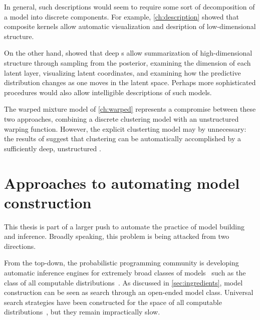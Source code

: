 \begin{itemize}
In general, such descriptions would seem to require some sort of decomposition of a model into discrete components.
For example, \cref{ch:description} showed that composite kernels allow automatic visualization and desription of low-dimensional structure.

On the other hand, \citet{damianou2012deep} showed that deep \gplvm{}s allow summarization of high-dimensional structure through sampling from the posterior, examining the dimension of each latent layer, visualizing latent coordinates, and examining how the predictive distribution changes as one moves in the latent space.
Perhaps more sophisticated procedures would also allow intelligible descriptions of such models.

\end{itemize}

The warped mixture model of \cref{ch:warped} represents a compromise between these two approaches, combining a discrete clustering model with an unstructured warping function.
However, the explicit clusterting model may by unnecessary: the results of \citet{damianou2012deep} suggest that clustering can be automatically accomplished by a sufficiently deep, unstructured \gp{}.




\section{Approaches to automating model construction}

This thesis is part of a larger push to automate the practice of model building and inference.
Broadly speaking, this problem is being attacked from two directions.

From the top-down, the probabilistic programming community is developing automatic inference engines for extremely broad classes of models~\citep{goodman2008church,mansinghka2014venture,liang2010learning} such as the class of all computable distributions~\citep{solomonoff1964formal, li2009introduction}.
As discussed in \cref{sec:ingredients}, model construction can be seen as search through an open-ended model class.
Universal search strategies have been constructed for the space of all computable distributions~\citep{hutter2002fastest,schmidhuber2002speed,levin1973universal}, but they remain impractically slow.

